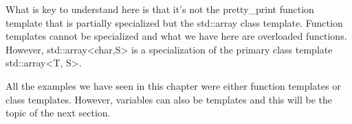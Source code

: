 What is key to understand here is that it's not the pretty\_print function template that is partially specialized but the std::array class template. Function templates cannot be specialized and what we have here are overloaded functions. However, std::array<char,S> is a specialization of the primary class template std::array<T, S>.

All the examples we have seen in this chapter were either function templates or class templates. However, variables can also be templates and this will be the topic of the next section.


